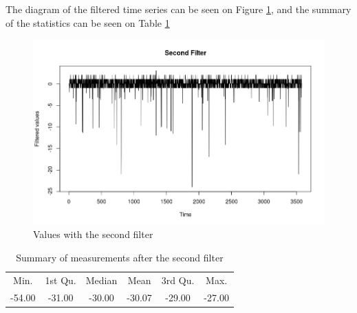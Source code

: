 The diagram of the filtered time series can be seen on Figure \ref{fig:SecondZero}, and the summary of the statistics can be seen on Table \ref{tab:summaryC}


\begin{figure}[!h]
	\centering
		\includegraphics[width=.9\linewidth]{figures/SecondFilter.png}
		\caption{Values with the second filter }\label{fig:SecondZero}
\end{figure}

		        		\begin{table}[!h]
		        		\centering
		        		\caption{Summary of measurements after the second filter }\label{tab:summaryC}
		        		\begin{tabular}{cccccc}
		        		Min.& 1st Qu. & Median & Mean & 3rd Qu. & Max.\\
		        		-54.00 & -31.00 & -30.00 & -30.07 & -29.00 & -27.00
		        		\end{tabular}
		        		\end{table}  
		   